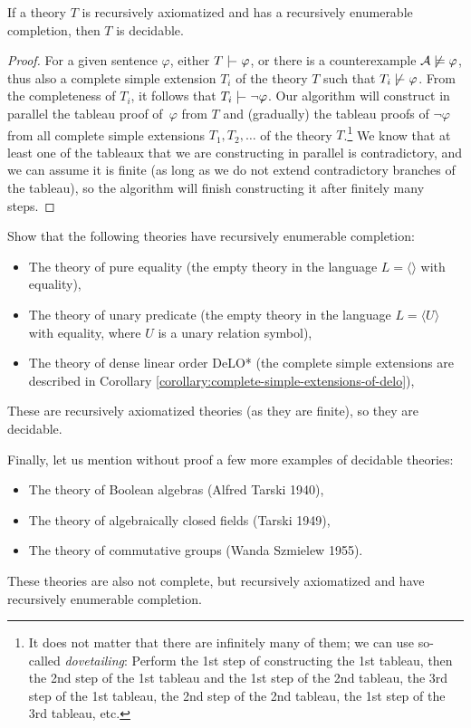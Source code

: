 \begin{proposition}\label{propositon:recursively-enumerable-completion}    
    If a theory $T$ is recursively axiomatized and has a recursively enumerable completion, then $T$ is decidable.
\end{proposition}
\begin{proof}
For a given sentence $\varphi$, either $T \proves \varphi$, or there is a counterexample $\mathcal{A} \not\models \varphi$, thus also a complete simple extension $T_i$ of the theory $T$ such that $T_i \not\proves \varphi$. From the completeness of $T_i$, it follows that $T_i \proves \neg \varphi$. Our algorithm will construct in parallel the tableau proof of~$\varphi$ from $T$ and (gradually) the tableau proofs of $\neg \varphi$ from all complete simple extensions $T_1, T_2, \dots$ of the theory $T$.\footnote{It does not matter that there are infinitely many of them; we can use so-called \emph{dovetailing}: Perform the 1st step of constructing the 1st tableau, then the 2nd step of the 1st tableau and the 1st step of the 2nd tableau, the 3rd step of the 1st tableau, the 2nd step of the 2nd tableau, the 1st step of the 3rd tableau, etc.} We know that at least one of the tableaux that we are constructing in parallel is contradictory, and we can assume it is finite (as long as we do not extend contradictory branches of the tableau), so the algorithm will finish constructing it after finitely many steps.
\end{proof}

\begin{exercise}
Show that the following theories have recursively enumerable completion:
\begin{itemize}
\item The theory of pure equality (the empty theory in the language $L = \langle \rangle$ with equality),
\item The theory of unary predicate (the empty theory in the language $L = \langle U \rangle$ with equality, where $U$ is a unary relation symbol),
\item The theory of dense linear order DeLO* (the complete simple extensions are described in Corollary \ref{corollary:complete-simple-extensions-of-delo}),
\end{itemize}
These are recursively axiomatized theories (as they are finite), so they are decidable.
\end{exercise}

\begin{example}
    Finally, let us mention without proof a few more examples of decidable theories:
    \begin{itemize}  
        \item The theory of Boolean algebras (Alfred Tarski 1940),
        \item The theory of algebraically closed fields (Tarski 1949),
        \item The theory of commutative groups (Wanda Szmielew 1955).
    \end{itemize}
    These theories are also not complete, but recursively axiomatized and have recursively enumerable completion.
\end{example}

